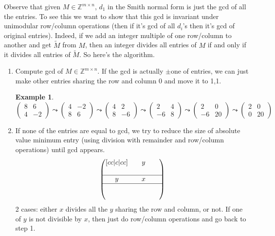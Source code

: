 \documentclass[a4paper]{article}
\theoremstyle{definition}
\newtheorem{example}[defn]{Example}
\begin{document}
Observe that given $M \in \mathbb Z^{m\times n}$, $d_1$ in the Smith normal form is just the gcd of all the entries. To see this we want to show that this gcd is invariant under unimodular row/column operations (then if it's gcd of all $d_i$'s then it's gcd of original entries). Indeed, if we add an integer multiple of one row/column to another and get $\widetilde{M}$ from $M$, then an integer divides all entries of $M$ if and only if it divides all entries of $\widetilde{M}$. So here's the algorithm.
\begin{enumerate}
\item Compute gcd of $M\in \mathbb Z^{m\times n}$. If the gcd is actually $\pm$one of entries, we can just make other entries sharing the row and column 0 and move it to 1,1.
\begin{example}
\[
\begin{pmatrix}
    8 & 6 \\ 4 & -2
\end{pmatrix} \leadsto \begin{pmatrix}
    4 & -2 \\ 8 & 6
\end{pmatrix}\leadsto \begin{pmatrix}
    4 & 2 \\ 8 & -6
\end{pmatrix} \leadsto \begin{pmatrix}
    2 & 4 \\ -6 & 8
\end{pmatrix} \leadsto \begin{pmatrix}
    2 & 0 \\ -6 & 20
\end{pmatrix} \leadsto \begin{pmatrix}
    2 & 0 \\ 0 & 20
\end{pmatrix}
\]
\end{example}
\item If none of the entries are equal to gcd, we try to reduce the size of absolute value minimum entry (using division with remainder and row/column operations) until gcd appears.
\[
\begin{pmatrix}[cc|c|cc]
&&y&& \\&&&& \\ \hline
y & & x & & \\ \hline
 &&&& \\ &&&&
\end{pmatrix}
\]
2 cases: either $x$ divides all the $y$ sharing the row and column, or not. If one of $y$ is not divisible by $x$, then just do row/column operations and go back to step 1.

\end{enumerate}
\end{document}
